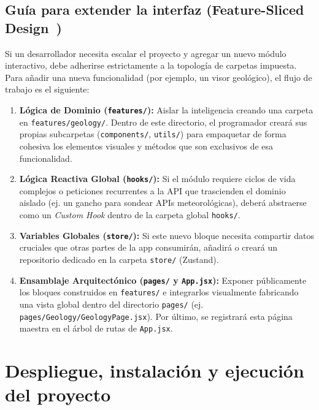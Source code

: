 \subsection{Guía para extender la interfaz (Feature-Sliced Design~\cite{featuresliced})}
Si un desarrollador necesita escalar el proyecto y agregar un nuevo módulo interactivo, debe adherirse estrictamente a la topología de carpetas impuesta. Para añadir una nueva funcionalidad (por ejemplo, un visor geológico), el flujo de trabajo es el siguiente:
\begin{enumerate}
    \item \textbf{Lógica de Dominio (\texttt{features/}):} Aislar la inteligencia creando una carpeta en \texttt{features/geology/}. Dentro de este directorio, el programador creará sus propias subcarpetas (\texttt{components/}, \texttt{utils/}) para empaquetar de forma cohesiva los elementos visuales y métodos que son exclusivos de esa funcionalidad.
    \item \textbf{Lógica Reactiva Global (\texttt{hooks/}):} Si el módulo requiere ciclos de vida complejos o peticiones recurrentes a la API que trascienden el dominio aislado (ej. un gancho para sondear APIs meteorológicas), deberá abstraerse como un \textit{Custom Hook} dentro de la carpeta global \texttt{hooks/}.
    \item \textbf{Variables Globales (\texttt{store/}):} Si este nuevo bloque necesita compartir datos cruciales que otras partes de la app consumirán, añadirá o creará un repositorio dedicado en la carpeta \texttt{store/} (Zustand).
    \item \textbf{Ensamblaje Arquitectónico (\texttt{pages/} y \texttt{App.jsx}):} Exponer públicamente los bloques construidos en \texttt{features/} e integrarlos visualmente fabricando una vista global dentro del directorio \texttt{pages/} (ej. \texttt{pages/Geology/GeologyPage.jsx}). Por último, se registrará esta página maestra en el árbol de rutas de \texttt{App.jsx}.
\end{enumerate}


\section{Despliegue, instalación y ejecución del proyecto}

